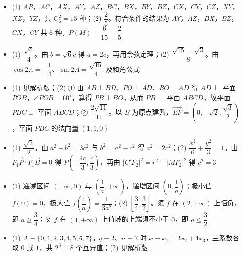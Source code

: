 \begin{itemize}[leftmargin=2.6em]
  \item[\textbf{15.}] (1) $AB$，$AC$，$AX$，$AY$，$AZ$，$BC$，$BX$，$BY$，$BZ$，$CX$，$CY$，$CZ$，$XY$，$XZ$，$YZ$，共 $\mathrm C_6^2=15$ 种；(2) $\dfrac25$。符合条件的结果为 $AY$，$AZ$，$BX$，$BZ$，$CX$，$CY$ 共 $6$ 种，$P(M)=\dfrac{6}{15}=\dfrac25$
  \item[\textbf{16.}] (1) $\dfrac{\sqrt6}{4}$。由 $b=\sqrt6c$ 得 $a=2c$，再用余弦定理；(2) $\dfrac{\sqrt{15}-\sqrt3}{8}$。由 $\cos2A=-\dfrac14$、$\sin2A=\dfrac{\sqrt{15}}{4}$ 及和角公式
  \item[\textbf{17.}] (1) 见解析版；(2) ① 由 $AB\perp BD$、$PO\perp AD$、$BO\perp AD$ 得 $AD\perp$ 平面 $POB$，$\angle POB=60^\circ$，算得 $PB\perp BO$，从而 $PB\perp$ 平面 $ABCD$，故平面 $PBC\perp$ 平面 $ABCD$；② $\dfrac{2\sqrt{11}}{11}$。以 $B$ 为原点建系，$\overrightarrow{EF}=\left(0,-\sqrt2,\dfrac{\sqrt3}{2}\right)$，平面 $PBC$ 的法向量 $(1,1,0)$
  \item[\textbf{18.}] (1) $\dfrac{\sqrt2}{2}$。由 $a^2+b^2=3c^2$ 与 $b^2=a^2-c^2$ 得 $a^2=2c^2$；(2) $\dfrac{x^2}{6}+\dfrac{y^2}{3}=1$。由 $\overrightarrow{F_1P}\cdot\overrightarrow{F_1B}=0$ 得 $P\left(-\dfrac{4c}{3},\dfrac c3\right)$，再由 $|C'F_2|^2=r^2+|MF_2|^2$ 得 $c^2=3$
  \item[\textbf{19.}] (1) 递减区间 $(-\infty,0)$ 与 $\left(\dfrac1a,+\infty\right)$，递增区间 $\left(0,\dfrac1a\right)$；极小值 $f(0)=0$，极大值 $f\left(\dfrac1a\right)=\dfrac{1}{3a^2}$；(2) $\left[\dfrac34,\dfrac32\right]$。须 $f$ 在 $(2,+\infty)$ 上恒负，即 $a\geqslant\dfrac34$；又 $f$ 在 $(1,+\infty)$ 上值域的上端须不小于 $0$，即 $a\leqslant\dfrac32$
  \item[\textbf{20.}] (1) $A=\{0,1,2,3,4,5,6,7\}$。$q=2$、$n=3$ 时 $x=x_1+2x_2+4x_3$，三系数各取 $0$ 或 $1$，共 $2^3=8$ 个互异值；(2) 见解析版
\end{itemize}
